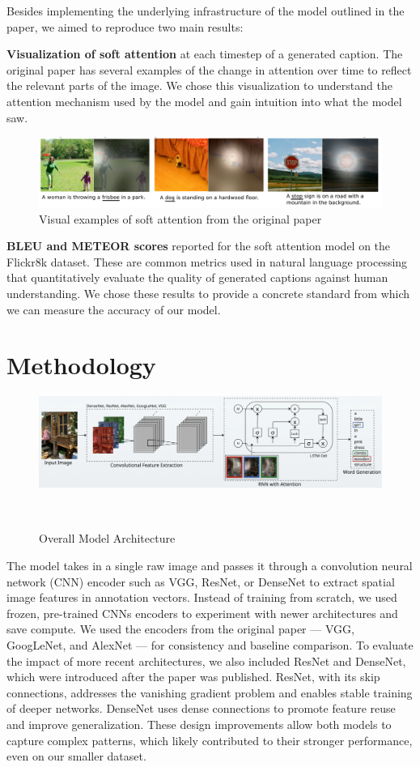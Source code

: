 \documentclass{article}
\begin{document}
Besides implementing the underlying infrastructure of the model outlined in the paper, we aimed to reproduce two main results:

\textbf{Visualization of soft attention} at each timestep of a generated caption. The original paper has several examples of the change in attention over time to reflect the relevant parts of the image. We chose this visualization to understand the attention mechanism used by the model and gain intuition into what the model saw.

\begin{figure}[h]
    \centering
    \includegraphics[width=0.9\linewidth]{chosen-results.png}
    \caption{Visual examples of soft attention from the original paper}
    \label{fig:results}
\end{figure}

\textbf{BLEU and METEOR scores} reported for the soft attention model on the Flickr8k dataset. These are common metrics used in natural language processing that quantitatively evaluate the quality of generated captions against human understanding. We chose these results to provide a concrete standard from which we can measure the accuracy of our model.


\section{Methodology}
\begin{figure}[h]
    \centering
    \includegraphics[scale=0.2]{methodology.png}
    \caption{Overall Model Architecture}
    \
\end{figure}
The model takes in a single raw image and passes it through a convolution neural network (CNN) encoder such as VGG, ResNet, or DenseNet to extract spatial image features in annotation vectors. Instead of training from scratch, we used frozen, pre-trained CNNs encoders to experiment with newer architectures and save compute. We used the encoders from the original paper --- VGG, GoogLeNet, and AlexNet --- for consistency and baseline comparison. To evaluate the impact of more recent architectures, we also included ResNet and DenseNet, which were introduced after the paper was published. ResNet, with its skip connections, addresses the vanishing gradient problem and enables stable training of deeper networks. DenseNet uses dense connections to promote feature reuse and improve generalization. These design improvements allow both models to capture complex patterns, which likely contributed to their stronger performance, even on our smaller dataset.
\end{document}
